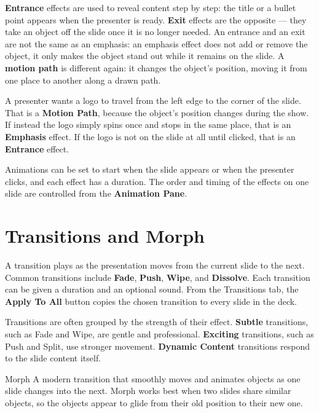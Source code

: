 \textbf{Entrance} effects are used to reveal content step by step: the title or
a bullet point appears when the presenter is ready. \textbf{Exit} effects are
the opposite --- they take an object off the slide once it is no longer needed.
An entrance and an exit are not the same as an emphasis: an emphasis effect
does not add or remove the object, it only makes the object stand out while it
remains on the slide. A \textbf{motion path} is different again: it changes the
object's position, moving it from one place to another along a drawn path.

\begin{example}
A presenter wants a logo to travel from the left edge to the corner of the
slide. That is a \textbf{Motion Path}, because the object's position changes
during the show. If instead the logo simply spins once and stops in the same
place, that is an \textbf{Emphasis} effect. If the logo is not on the slide at
all until clicked, that is an \textbf{Entrance} effect.
\end{example}

Animations can be set to start when the slide appears or when the presenter
clicks, and each effect has a duration. The order and timing of the effects on
one slide are controlled from the \textbf{Animation Pane}.

\section{Transitions and Morph}
A transition plays as the presentation moves from the current slide to the
next. Common transitions include \textbf{Fade}, \textbf{Push}, \textbf{Wipe},
and \textbf{Dissolve}. Each transition can be given a duration and an optional
sound. From the Transitions tab, the \textbf{Apply To All} button copies the
chosen transition to every slide in the deck.

Transitions are often grouped by the strength of their effect. \textbf{Subtle}
transitions, such as Fade and Wipe, are gentle and professional.
\textbf{Exciting} transitions, such as Push and Split, use stronger movement.
\textbf{Dynamic Content} transitions respond to the slide content itself.

\begin{definitionbox}{Morph}
A modern transition that smoothly moves and animates objects as one slide
changes into the next. Morph works best when two slides share similar objects,
so the objects appear to glide from their old position to their new one.
\end{definitionbox}


